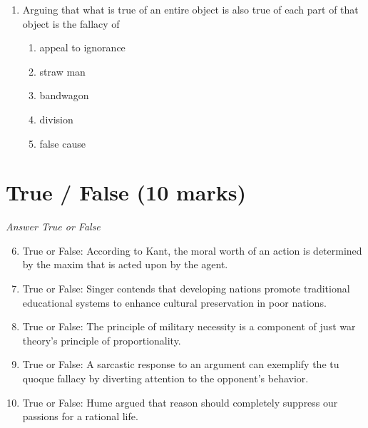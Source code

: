 \documentclass[12pt]{article}
\begin{document}
\begin{enumerate}[label=\arabic*.]
\begin{enumerate}[label=(\alph*)]
    \item very inefficiently, and are therefore not worth donating to.
    \item with a high level of bureaucracy and corruption, therefore not recommended.
    \item more effectively than we could get it to our close neighbors.
    \item extremely efficiently, making them the only viable option for aid distribution.
\end{enumerate}
\item Arguing that what is true of an entire object is also true of each part of that object is the fallacy of
\begin{enumerate}[label=(\alph*)]
    \item appeal to ignorance
    \item straw man
    \item bandwagon
    \item division
    \item false cause
\end{enumerate}
\end{enumerate}

\section*{True / False (10 marks)}
\textit{Answer True or False}
\begin{enumerate}[label=\arabic*.]
\setcounter{enumi}{5}
\item True or False: According to Kant, the moral worth of an action is determined by the maxim that is acted upon by the agent.
\item True or False: Singer contends that developing nations promote traditional educational systems to enhance cultural preservation in poor nations.
\item True or False: The principle of military necessity is a component of just war theory's principle of proportionality.
\item True or False: A sarcastic response to an argument can exemplify the tu quoque fallacy by diverting attention to the opponent's behavior.
\item True or False: Hume argued that reason should completely suppress our passions for a rational life.
\end{enumerate}
\end{document}
